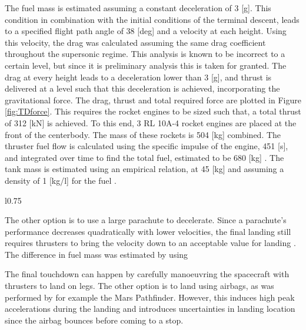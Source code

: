 The fuel mass is estimated assuming a constant deceleration of 3 [g]. This condition in combination with the initial conditions of the terminal descent, leads to a specified flight path angle of 38 [deg] and a velocity at each height. Using this velocity, the drag was calculated assuming the same drag coefficient throughout the supersonic regime. This analysis is known to be incorrect to a certain level, but since it is preliminary analysis this is taken for granted. The drag at every height leads to a deceleration lower than 3 [g], and thrust is delivered at a level such that this deceleration is achieved, incorporating the gravitational force. The drag, thrust and total required force are plotted in Figure \ref{fig:TDforce}. This requires the rocket engines to be sized such that, a total thrust of 312 [kN] is achieved. To this end, 3 RL 10A-4 rocket engines are placed at the front of the centerbody. The mass of these rockets is 504 [kg] combined. The thruster fuel flow is calculated using the specific impulse of the engine, 451 [s], and integrated over time to find the total fuel, estimated to be 680 [kg] \cite{Wertz2011}. The tank mass is estimated using an empirical relation, at 45 [kg] and assuming a density of 1 [kg/l] for the fuel \cite{Wertz2011}.

\begin{wrapfigure}{l}{0.75\textwidth}
	\centering
	\setlength{} 
	\setlength{}
	
	\caption{Thrust, drag and required force for 3 [g] deceleration starting from 15 [km] height at $M=5$}
	\label{fig:TDforce}
\end{wrapfigure}


The other option is to use a large parachute to decelerate. Since a parachute's performance decreases quadratically with lower velocities, the final landing still requires thrusters to bring the velocity down to an acceptable value for landing \cite{Braun2007}. The difference in fuel mass was estimated by using 

The final touchdown can happen by carefully manoeuvring the spacecraft with thrusters to land on legs. The other option is to land using airbags, as was performed by for example the Mars Pathfinder. However, this induces high peak accelerations during the landing and introduces uncertainties in landing location since the airbag bounces before coming to a stop.

